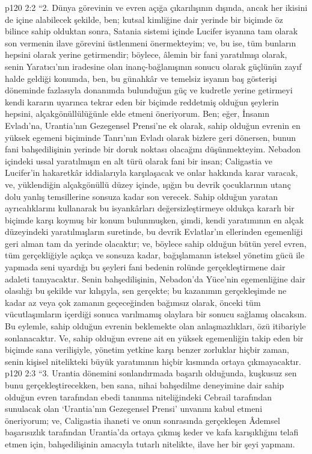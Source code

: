\vs p120 2:2 “2. Dünya görevinin ve evren açığa çıkarılışının dışında, ancak her ikisini de içine alabilecek şekilde, ben; kutsal kimliğine dair yerinde bir biçimde öz bilince sahip olduktan sonra, Satania sistemi içinde Lucifer isyanına tam olarak son vermenin ilave görevini üstlenmeni önermekteyim; ve, bu ise, tüm bunların hepsini  olarak yerine getirmendir; böylece, âlemin bir fani yaratılmışı olarak, senin Yaratıcı’nın iradesine olan inanç\hyp{}bağlanışının sonucu olarak güçlünün zayıf halde geldiği konumda, ben, bu günahkâr ve temelsiz isyanın baş gösterişi döneminde fazlasıyla donanımda bulunduğun güç ve kudretle yerine getirmeyi kendi kararın uyarınca tekrar eden bir biçimde reddetmiş olduğun şeylerin hepsini, alçakgönüllülüğünle elde etmeni öneriyorum. Ben; eğer, İnsanın Evladı’na, Urantia’nın Gezegensel Prensi’ne ek olarak, sahip olduğun evrenin en yüksek egemeni biçiminde Tanrı’nın Evladı olarak bizlere geri dönersen, bunun fani bahşedilişinin yerinde bir doruk noktası olacağını düşünmekteyim. Nebadon içindeki ussal yaratılmışın en alt türü olarak fani bir insan; Caligastia ve Lucifer’in hakaretkâr iddialarıyla karşılaşacak ve onlar hakkında karar varacak, ve, yüklendiğin alçakgönüllü düzey içinde, ışığın bu devrik çocuklarının utanç dolu yanlış temsillerine sonsuza kadar son verecek. Sahip olduğun yaratan ayrıcalıklarını kullanarak bu isyankârları değersizleştirmeye oldukça kararlı bir biçimde karşı koymuş bir konum bulunmuşken, şimdi, kendi yaratımının en alçak düzeyindeki yaratılmışların suretinde, bu devrik Evlatlar’ın ellerinden egemenliği geri alman tam da yerinde olacaktır; ve, böylece sahip olduğun bütün yerel evren, tüm gerçekliğiyle açıkça ve sonsuza kadar, bağışlamanın isteksel yönetim gücü ile yapmada seni uyardığı bu şeyleri fani bedenin rolünde gerçekleştirmene dair adaleti tanıyacaktır. Senin bahşedilişinin, Nebadon’da Yüce’nin egemenliğine dair olasılığı bu şekilde var kılışıyla, sen gerçekte; bu kazanımın gerçekleşimde ne kadar az veya çok zamanın geçeceğinden bağımsız olarak, önceki tüm vücutlaşımların içerdiği sonuca varılmamış olaylara bir sonucu sağlamış olacaksın. Bu eylemle, sahip olduğun evrenin beklemekte olan anlaşmazlıkları, özü itibariyle sonlanacaktır. Ve, sahip olduğun evrene ait en yüksek egemenliğin takip eden bir biçimde sana verilişiyle, yönetim yetkine karşı benzer zorluklar hiçbir zaman, senin kişisel nitelikteki büyük yaratımının hiçbir kısmında ortaya çıkmayacaktır.
\vs p120 2:3 “3. Urantia dönemini sonlandırmada başarılı olduğunda, kuşkusuz sen bunu gerçekleştirecekken, ben sana, nihai bahşedilme deneyimine dair sahip olduğun evren tarafından ebedi tanınma niteliğindeki Cebrail tarafından sunulacak olan ‘Urantia’nın Gezegensel Prensi’ unvanını kabul etmeni öneriyorum; ve, Caligastia ihaneti ve onun sonrasında gerçekleşen Âdemsel başarısızlık tarafından Urantia’da ortaya çıkmış keder ve kafa karışıklığını telafi etmen için, bahşedilişinin amacıyla tutarlı nitelikte, ilave her bir şeyi yapmanı.
